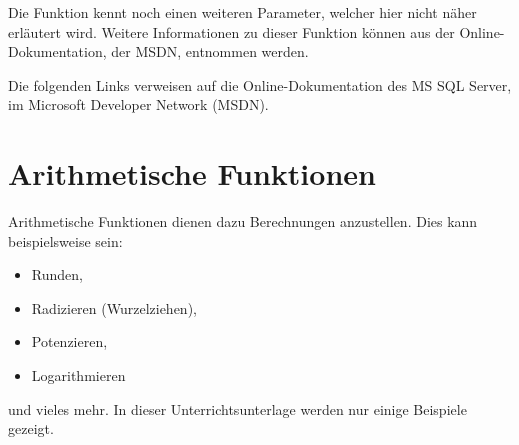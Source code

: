           \begin{merke}
            Die Funktion  kennt noch einen weiteren
            Parameter, welcher hier nicht näher erläutert wird. Weitere
            Informationen zu dieser Funktion können aus der
            Online-Dokumentation, der MSDN, entnommen werden.
          \end{merke}
          Die folgenden Links verweisen auf die Online-Dokumentation des MS SQL
          Server, im Microsoft Developer Network (MSDN).
          \begin{literaturinternet}
            \item \cite{ms190329}
            \item \cite{ms187748}
            \item \cite{ms186323}
          \end{literaturinternet}
    \section{Arithmetische Funktionen}
      Arithmetische Funktionen dienen dazu Berechnungen anzustellen. Dies kann
      beispielsweise sein:
      \begin{itemize}
        \item Runden,
        \item Radizieren (Wurzelziehen),
        \item Potenzieren,
        \item Logarithmieren
      \end{itemize}
      und vieles mehr. In dieser Unterrichtsunterlage werden nur einige
      Beispiele gezeigt.
